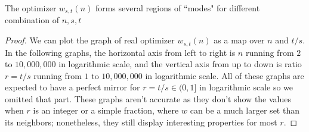 \documentclass[]{article}
\begin{document}
\vspace{1cm}
\begin{lemma} [Modes]
	The optimizer $w_{s,t}(n)$ forms several regions of ``modes" for different combination of ${n,s,t}$
\end{lemma}
\begin{proof}
	We can plot the graph of real optimizer $w_{s,t}(n)$ as a map over $n$ and $t/s$. In the following graphs, the horizontal axis from left to right is $n$ running from $2$ to $10,000,000$ in logarithmic scale, and the vertical axis from up to down is ratio $r= t/s$ running from $1$ to $10,000,000$ in logarithmic scale.  All of these graphs are expected to have a perfect mirror for $r= t/s \in (0, 1]$ in logarithmic scale so we omitted that part. These graphs aren't accurate as they don't show the values when $r$ is an integer or a simple fraction, where $w$ can be a much larger set than its neighbors; nonetheless, they still display interesting properties for most $r$.
	

\end{proof}
\end{document}

